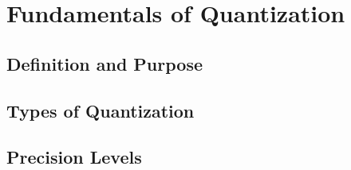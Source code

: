 \section{Fundamentals of Quantization}


\subsection{Definition and Purpose}

\subsection{Types of Quantization}

\subsection{Precision Levels}

